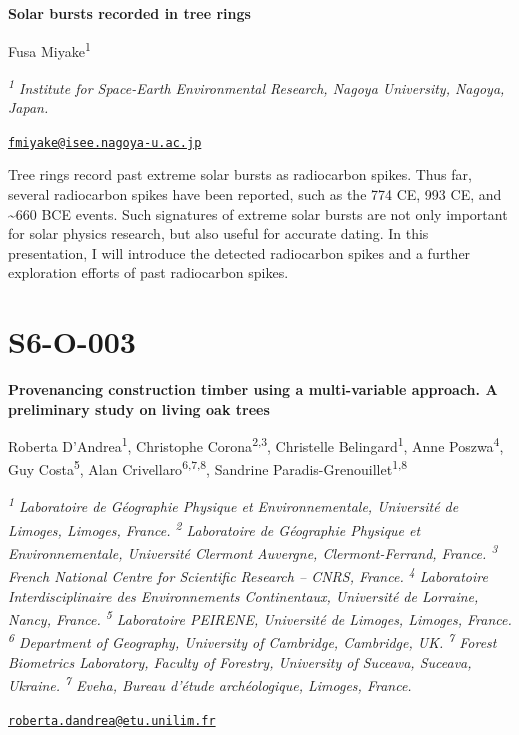 \documentclass[
]{book}
\begin{document}
\textbf{Solar bursts recorded in tree rings}

Fusa Miyake\textsuperscript{1}

\emph{\textsuperscript{1} Institute for Space-Earth Environmental Research, Nagoya University, Nagoya, Japan.}

\href{mailto:fmiyake@isee.nagoya-u.ac.jp}{\nolinkurl{fmiyake@isee.nagoya-u.ac.jp}}

Tree rings record past extreme solar bursts as radiocarbon spikes. Thus far, several radiocarbon spikes have been reported, such as the 774 CE, 993 CE, and \textasciitilde660 BCE events. Such signatures of extreme solar bursts are not only important for solar physics research, but also useful for accurate dating. In this presentation, I will introduce the detected radiocarbon spikes and a further exploration efforts of past radiocarbon spikes.

\hypertarget{s6-o-003}{%
\section*{S6-O-003}\label{s6-o-003}}

\textbf{Provenancing construction timber using a multi-variable approach. A preliminary study on living oak trees}

Roberta D'Andrea\textsuperscript{1}, Christophe Corona\textsuperscript{2,3}, Christelle Belingard\textsuperscript{1}, Anne Poszwa\textsuperscript{4}, Guy Costa\textsuperscript{5}, Alan Crivellaro\textsuperscript{6,7,8}, Sandrine Paradis-Grenouillet\textsuperscript{1,8}

\emph{\textsuperscript{1} Laboratoire de Géographie Physique et Environnementale, Université de Limoges, Limoges, France. \textsuperscript{2} Laboratoire de Géographie Physique et Environnementale, Université Clermont Auvergne, Clermont-Ferrand, France. \textsuperscript{3} French National Centre for Scientific Research -- CNRS, France. \textsuperscript{4} Laboratoire Interdisciplinaire des Environnements Continentaux, Université de Lorraine, Nancy, France. \textsuperscript{5} Laboratoire PEIRENE, Université de Limoges, Limoges, France. \textsuperscript{6} Department of Geography, University of Cambridge, Cambridge, UK. \textsuperscript{7} Forest Biometrics Laboratory, Faculty of Forestry, University of Suceava, Suceava, Ukraine. \textsuperscript{7} Eveha, Bureau d'étude archéologique, Limoges, France.}

\href{mailto:roberta.dandrea@etu.unilim.fr}{\nolinkurl{roberta.dandrea@etu.unilim.fr}}
\end{document}
